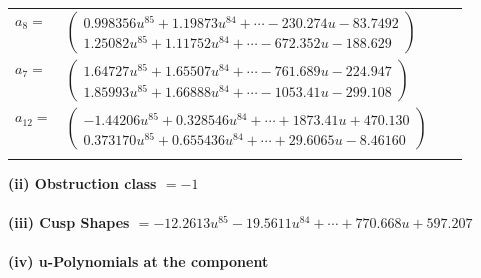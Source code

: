 \documentclass[1p]{elsarticle_modified}
\theoremstyle{definition}
\begin{document}
\begin{tabular}{m{7pt} m{180pt} m{7pt} m{180pt} }
\flushright $a_{8}=$&$\begin{pmatrix}0.998356 u^{85}+1.19873 u^{84}+\cdots-230.274 u-83.7492\\1.25082 u^{85}+1.11752 u^{84}+\cdots-672.352 u-188.629\end{pmatrix}$ \\
\flushright $a_{7}=$&$\begin{pmatrix}1.64727 u^{85}+1.65507 u^{84}+\cdots-761.689 u-224.947\\1.85993 u^{85}+1.66888 u^{84}+\cdots-1053.41 u-299.108\end{pmatrix}$ \\
\flushright $a_{12}=$&$\begin{pmatrix}-1.44206 u^{85}+0.328546 u^{84}+\cdots+1873.41 u+470.130\\0.373170 u^{85}+0.655436 u^{84}+\cdots+29.6065 u-8.46160\end{pmatrix}$\\&\end{tabular}
\flushleft \textbf{(ii) Obstruction class $= -1$}\\~\\
\flushleft \textbf{(iii) Cusp Shapes $= -12.2613 u^{85}-19.5611 u^{84}+\cdots+770.668 u+597.207$}\\~\\
\newpage\renewcommand{\arraystretch}{1}
\flushleft \textbf{(iv) u-Polynomials at the component}\newline \\
\end{document}
